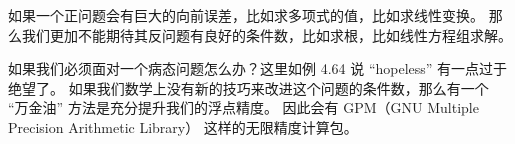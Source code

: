 \documentclass[a4paper]{ctexart}
\begin{document}
{如果一个正问题会有巨大的向前误差，比如求多项式的值，比如求线性变换。
那么我们更加不能期待其反问题有良好的条件数，比如求根，比如线性方程组求解。
 
如果我们必须面对一个病态问题怎么办？这里如例 4.64 说 ``hopeless'' 有一点过于绝望了。 
如果我们数学上没有新的技巧来改进这个问题的条件数，那么有一个 ``万金油'' 方法是充分提升我们的浮点精度。
因此会有 GPM（GNU Multiple Precision Arithmetic Library） 这样的无限精度计算包。






}
\end{document}
